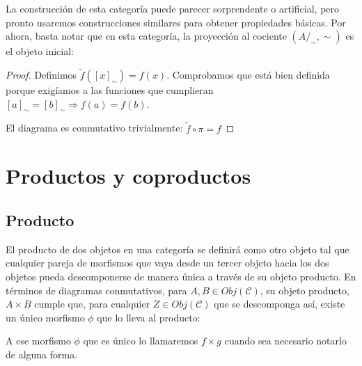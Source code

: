 \documentclass[11pt, fleqn, spanish]{book}
\newcommand{\C}{\mathcal{C}}
\begin{document}
La construcción de esta categoría puede parecer sorprendente o
artificial, pero pronto usaremos construcciones similares para obtener
propiedades básicas.  Por ahora, basta notar que en esta categoría, la
proyección al cociente $(A/_\sim,\sim)$ es el objeto inicial:

\begin{center}
\end{center}

\begin{proof}
  Definimos $\tilde f ([x]_\sim) = f(x)$. Comprobamos que está bien
  definida porque exigíamos a las funciones que cumplieran
  $[a]_{\sim} = [b]_{\sim} \Rightarrow f(a) = f(b)$.
  
  El diagrama es conmutativo trivialmente: $\tilde f \circ \pi = f$
\end{proof} 
 

\section {Productos y coproductos}
\subsection{Producto}
El producto de dos objetos en una categoría se definirá como otro
objeto tal que cualquier pareja de morfismos que vaya desde un tercer
objeto hacia los dos objetos pueda descomponerse de manera única a
través de su objeto producto.  En términos de diagramas conmutativos,
para $A,B \in Obj(\C)$, su objeto producto, $A \times B$ cumple que,
para cualquier $Z \in Obj(\C)$ que se descomponga así, existe un
único morfismo $\phi$ que lo lleva al producto:

\begin{center}
\end{center}

A ese morfismo $\phi$ que es único lo llamaremos $f \times g$ cuando
sea necesario notarlo de alguna forma.
    
\end{document}
